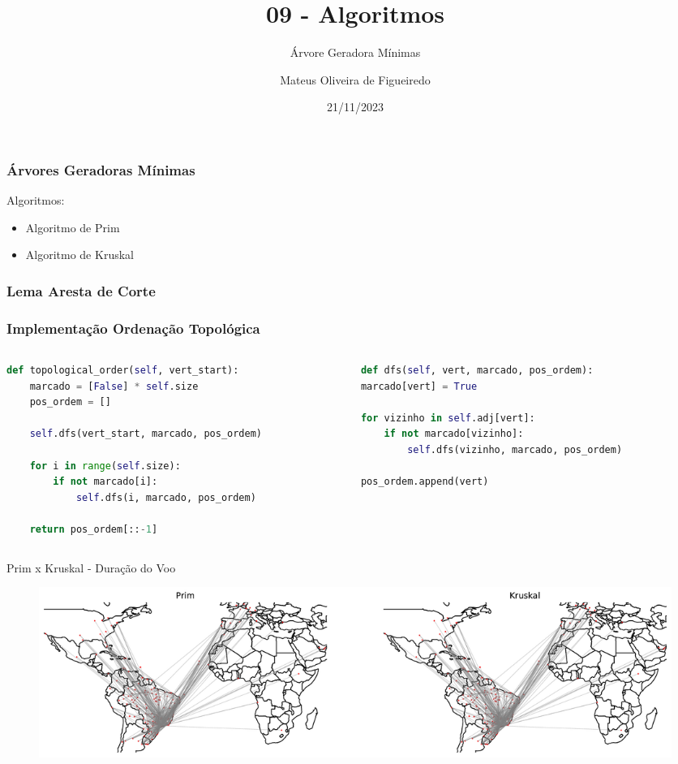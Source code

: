 \documentclass[aspectratio=169,usenames,dvipsnames]{beamer}
\title{09 - Algoritmos}
\subtitle{Árvore Geradora Mínimas}
\author{Mateus Oliveira de Figueiredo}
\date{21/11/2023}
\begin{document}
\begin{frame}
\titlepage
\end{frame}

\begin{frame}
\frametitle{Árvores Geradoras Mínimas}
\vfill
Algoritmos:
\begin{itemize}
  \item Algoritmo de Prim
  \item Algoritmo de Kruskal
\end{itemize}
\vfill
\end{frame}


\begin{frame}
\frametitle{Lema Aresta de Corte}

\end{frame}

\begin{frame}[fragile]  %
  \frametitle{Implementação Ordenação Topológica}

  \begin{columns}
    \begin{column}{0.5\textwidth}
      \begin{lstlisting}[language=Python]
def topological_order(self, vert_start):
    marcado = [False] * self.size
    pos_ordem = []

    self.dfs(vert_start, marcado, pos_ordem)

    for i in range(self.size):
        if not marcado[i]:
            self.dfs(i, marcado, pos_ordem)

    return pos_ordem[::-1]
      \end{lstlisting}
    \end{column}
    \begin{column}{0.5\textwidth}
      \begin{lstlisting}[language=Python]
def dfs(self, vert, marcado, pos_ordem):
marcado[vert] = True

for vizinho in self.adj[vert]:
    if not marcado[vizinho]:
        self.dfs(vizinho, marcado, pos_ordem)

pos_ordem.append(vert)
      \end{lstlisting}
    \end{column}
  \end{columns}

\end{frame}


\begin{frame}{Prim x Kruskal - Duração do Voo}
    \begin{figure}[ht]
        \centering
        \includegraphics[width=\textwidth]{figs/world_time_mst_0.pdf}
    \end{figure}
\end{frame}
\end{document}
